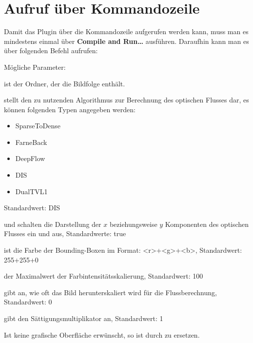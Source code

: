 \section{Aufruf über Kommandozeile}

Damit das Plugin über die Kommandozeile aufgerufen werden kann, muss man es mindestens einmal über \textbf{Compile and Run\dots} ausführen. Daraufhin kann man es über folgenden Befehl aufrufen:



Mögliche Parameter:

 ist der Ordner, der die Bildfolge enthält.

 stellt den zu nutzenden Algorithmus zur Berechnung des optischen Flusses dar, es können folgenden Typen angegeben werden:

\begin{itemize}
\item SparseToDense
\item FarneBack
\item DeepFlow
\item DIS
\item DualTVL1
\end{itemize}

Standardwert: DIS 

 und  schalten die Darstellung der $x$ beziehungsweise $y$ Komponenten des optischen Flusses ein und aus, Standardwerte: true

 ist die Farbe der Bounding-Boxen im Format: <r>+<g>+<b>, Standardwert: 255+255+0

 der Maximalwert der Farbintensitätsskalierung, Standardwert: 100

 gibt an, wie oft das Bild herunterskaliert wird für die Flussberechnung, Standardwert: 0

 gibt den Sättigungsmultiplikator an, Standardwert: 1


Ist keine grafische Oberfläche erwünscht, so ist  durch  zu ersetzen.